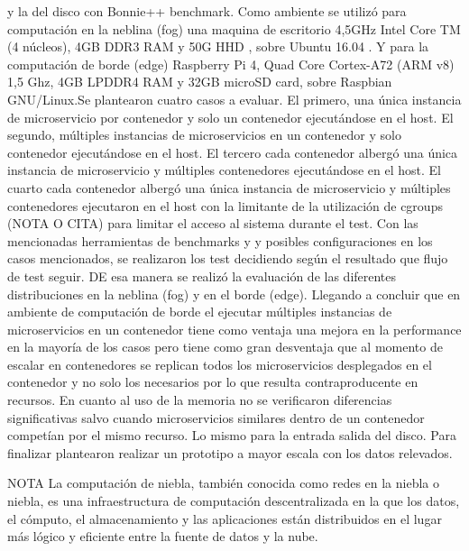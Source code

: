 y la del disco con Bonnie++ benchmark. Como ambiente se utilizó para computación en la neblina (fog) una maquina de escritorio 4,5GHz Intel Core TM (4 núcleos), 4GB DDR3 RAM y 50G HHD , sobre Ubuntu 16.04 . Y para la computación de borde (edge) Raspberry Pi 4, Quad Core Cortex-A72 (ARM v8) 1,5 Ghz, 4GB LPDDR4 RAM y 32GB microSD card, sobre Raspbian GNU/Linux.Se plantearon cuatro casos a evaluar. El primero, una única instancia de microservicio por contenedor y solo un contenedor ejecutándose en el host. El segundo, múltiples instancias de microservicios en un contenedor y solo contenedor ejecutándose en el host. El tercero cada contenedor albergó una única instancia de microservicio y múltiples contenedores ejecutándose en el host. El cuarto cada contenedor albergó una única instancia de microservicio y múltiples contenedores ejecutaron en el host con la limitante de la utilización de cgroups (NOTA O CITA) para limitar el acceso al sistema durante el test. Con las mencionadas herramientas de benchmarks y y posibles configuraciones en los casos mencionados, se realizaron los test decidiendo según el resultado que flujo de test seguir. DE esa manera se realizó la evaluación de las diferentes distribuciones en la neblina (fog) y en el borde (edge). Llegando a concluir que en ambiente de computación de borde el ejecutar múltiples instancias de microservicios en un contenedor tiene como ventaja una mejora en la performance en la mayoría de los casos pero tiene como gran desventaja que al momento de escalar en contenedores se replican todos los microservicios desplegados en el contenedor y no solo los necesarios por lo que resulta contraproducente en recursos. En cuanto al uso de la memoria no se verificaron diferencias significativas salvo cuando microservicios similares dentro de un contenedor competían por el mismo recurso. Lo mismo para la entrada salida del disco. Para finalizar plantearon realizar un prototipo a mayor escala con los datos relevados.


NOTA
La computación de niebla, también conocida como redes en la niebla o niebla, es una infraestructura de computación descentralizada en la que los datos, el cómputo, el almacenamiento y las aplicaciones están distribuidos en el lugar más lógico y eficiente entre la fuente de datos y la nube.
